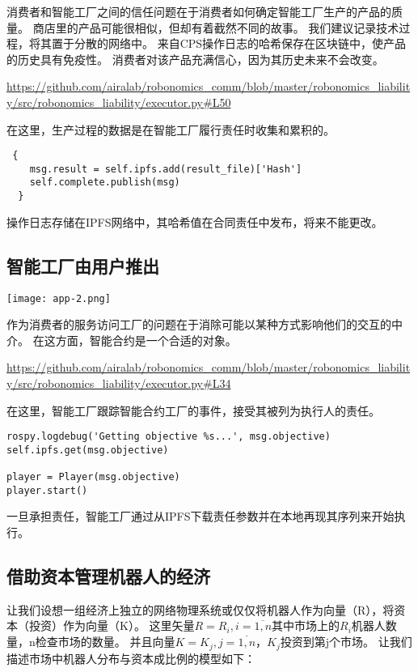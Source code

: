 \documentclass[UTF8]{article}
\begin{document}
消费者和智能工厂之间的信任问题在于消费者如何确定智能工厂生产的产品的质量。 商店里的产品可能很相似，但却有着截然不同的故事。 我们建议记录技术过程，将其置于分散的网络中。 来自CPS操作日志的哈希保存在区块链中，使产品的历史具有免疫性。 消费者对该产品充满信心，因为其历史未来不会改变。

\url{https://github.com/airalab/robonomics_comm/blob/master/robonomics_liability/src/robonomics_liability/executor.py#L50}

在这里，生产过程的数据是在智能工厂履行责任时收集和累积的。


\begin{lstlisting}
 {
	msg.result = self.ipfs.add(result_file)['Hash']
	self.complete.publish(msg)
  }
\end{lstlisting}


操作日志存储在IPFS网络中，其哈希值在合同责任中发布，将来不能更改。

\subsection{智能工厂由用户推出}

\texttt{[image: app-2.png]} 

作为消费者的服务访问工厂的问题在于消除可能以某种方式影响他们的交互的中介。 在这方面，智能合约是一个合适的对象。

\url{https://github.com/airalab/robonomics_comm/blob/master/robonomics_liability/src/robonomics_liability/executor.py#L34}

在这里，智能工厂跟踪智能合约工厂的事件，接受其被列为执行人的责任。

\begin{lstlisting}
rospy.logdebug('Getting objective %s...', msg.objective)
self.ipfs.get(msg.objective)

player = Player(msg.objective)
player.start()
\end{lstlisting}

一旦承担责任，智能工厂通过从IPFS下载责任参数并在本地再现其序列来开始执行。

\subsection{借助资本管理机器人的经济}

让我们设想一组经济上独立的网络物理系统或仅仅将机器人作为向量（R），将资本（投资）作为向量（K）。 这里矢量$ R = {R_i, i=\overline{1,n}}$其中市场上的$R_i$机器人数量，n检查市场的数量。 并且向量$ K = {K_j, j=\overline{1,n}} $，$K_j$投资到第j个市场。 让我们描述市场中机器人分布与资本成比例的模型如下：
\end{document}
